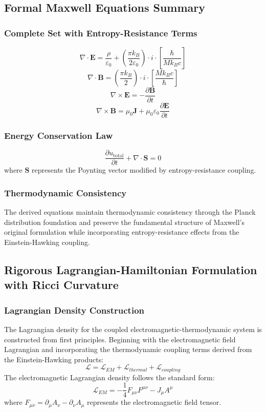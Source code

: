 ﻿\documentclass[12pt]{article}
\begin{document}
\subsection{Formal Maxwell Equations Summary}

\subsubsection{Complete Set with Entropy-Resistance Terms}
$$\nabla\cdot\mathbf{E} = \frac{\rho}{\varepsilon_0} + \left(\frac{\pi k_B}{2\varepsilon_0}\right)\cdot i\cdot\left[\frac{\hbar}{Mk_Bc}\right]$$
$$\nabla\cdot\mathbf{B} = \left(\frac{\pi k_B}{2}\right)\cdot i\cdot\left[\frac{Mk_Bc}{\hbar}\right]$$
$$\nabla\times\mathbf{E} = -\frac{\partial\mathbf{B}}{\partial t}$$
$$\nabla\times\mathbf{B} = \mu_0\mathbf{J} + \mu_0\varepsilon_0\frac{\partial\mathbf{E}}{\partial t}$$

\subsubsection{Energy Conservation Law}
$$\frac{\partial u_{\text{total}}}{\partial t} + \nabla\cdot\mathbf{S} = 0$$
where $\mathbf{S}$ represents the Poynting vector modified by entropy-resistance coupling.

\subsubsection{Thermodynamic Consistency}
The derived equations maintain thermodynamic consistency through the Planck distribution foundation and preserve the fundamental structure of Maxwell's original formulation while incorporating entropy-resistance effects from the Einstein-Hawking coupling.

\subsection{Rigorous Lagrangian-Hamiltonian Formulation with Ricci Curvature}

\subsubsection{Lagrangian Density Construction}
The Lagrangian density for the coupled electromagnetic-thermodynamic system is constructed from first principles. Beginning with the electromagnetic field Lagrangian and incorporating the thermodynamic coupling terms derived from the Einstein-Hawking products:
$$\mathcal{L} = \mathcal{L}_{EM} + \mathcal{L}_{thermal} + \mathcal{L}_{coupling}$$
The electromagnetic Lagrangian density follows the standard form:
$$\mathcal{L}_{EM} = -\frac{1}{4}F_{\mu\nu}F^{\mu\nu} - J_\mu A^\mu$$
where $F_{\mu\nu} = \partial_\mu A_\nu - \partial_\nu A_\mu$ represents the electromagnetic field tensor.
\end{document}
